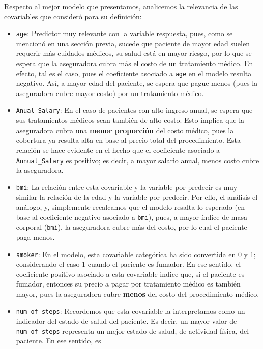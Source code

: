 \documentclass[
]{article}
\providecommand{\tightlist}{%
  \setlength{\itemsep}{0pt}\setlength{\parskip}{0pt}}\usepackage{longtable,booktabs,array}
\begin{document}
Respecto al mejor modelo que presentamos, analicemos la relevancia de
las covariables que consideró para su definición:

\begin{itemize}
\tightlist
\item
  \texttt{age}: Predictor muy relevante con la variable respuesta, pues,
  como se mencionó en una sección previa, sucede que paciente de mayor
  edad suelen requerir más cuidados médicos, su salud está en mayor
  riesgo, por lo que se espera que la aseguradora cubra más el costo de
  un tratamiento médico. En efecto, tal es el caso, pues el coeficiente
  asociado a \texttt{age} en el modelo resulta negativo. Así, a mayor
  edad del paciente, se espera que pague menos (pues la aseguradora
  cubre mayor costo) por un tratamiento médico.
\item
  \texttt{Anual\_Salary}: En el caso de pacientes con alto ingreso
  anual, se espera que sus tratamientos médicos sean también de alto
  costo. Esto implica que la aseguradora cubra una \textbf{menor
  proporción} del costo médico, pues la cobertura ya resulta alta en
  base al precio total del procedimiento. Esta relación se hace evidente
  en el hecho que el coeficiente asociado a \texttt{Annual\_Salary} es
  positivo; es decir, a mayor salario anual, menos costo cubre la
  aseguradora.
\item
  \texttt{bmi}: La relación entre esta covariable y la variable por
  predecir es muy similar la relación de la edad y la variable por
  predecir. Por ello, el análisis el análogo, y, simplemente recalcamos
  que el modelo resalta lo esperado (en base al coeficiente negativo
  asociado a \texttt{bmi}), pues, a mayor índice de masa corporal
  (\texttt{bmi}), la aseguradora cubre más del costo, por lo cual el
  paciente paga menos.
\item
  \texttt{smoker}: En el modelo, esta covariable categórica ha sido
  convertida en 0 y 1; considerando el caso 1 cuando el paciente es
  fumador. En ese sentido, el coeficiente positivo asociado a esta
  covariable indice que, si el paciente es fumador, entonces su precio a
  pagar por tratamiento médico es también mayor, pues la aseguradora
  cubre \textbf{menos} del costo del procedimiento médico.
\item
  \texttt{num\_of\_steps}: Recordemos que esta covariable la
  interpretamos como un indicador del estado de salud del paciente. Es
  decir, un mayor valor de \texttt{num\_of\_steps} representa un mejor
  estado de salud, de actividad física, del paciente. En ese sentido, es

\end{itemize}
\end{document}
